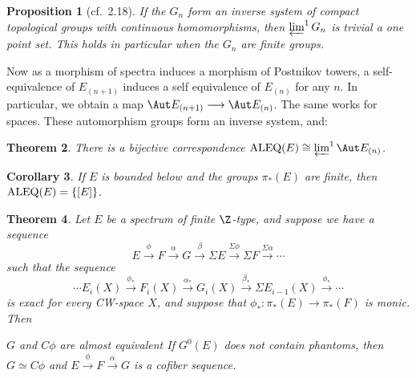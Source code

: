 \documentclass[11pt]{article}
\theoremstyle{plain}
\newtheorem{thm}{Theorem}[subsection]
\newtheorem{prop}[thm]{Proposition}
\newtheorem{cor}[thm]{Corollary}
\theoremstyle{definition}
\newcommand{\ALEQ}{\textup{ALEQ}}
\begin{document}
{\begin{prop}[cf.\ 2.18]
If the $G_n$ form an inverse system of compact topological groups with
continuous homomorphisms, then $\varprojlim^1G_n$ is trivial \lparen a one point
set\rparen. This holds in particular when the $G_n$ are finite groups.
\end{prop}
Now as a morphism of spectra induces a morphism of Postnikov towers, a
self-equivalence of $E_{(n+1)}$ induces a self equivalence of $E_{(n)}$ for any
$n$. In particular, we obtain a map $\Aut E_{(n+1)}\to \Aut E_{(n)}$. The same
works for spaces. These automorphism groups form an inverse system, and:
\begin{thm}
There is a bijective correspondence $\ALEQ(E)\cong\varprojlim^1\Aut E_{(n)}$.
\end{thm}
\begin{cor}
If $E$ is bounded below and the groups $\pi_*(E)$ are finite, then
$\ALEQ(E)=\{[E]\}$.
\end{cor}
\begin{thm}
Let $E$ be a spectrum of finite $\Z$-type, and suppose we have a sequence\upcol
\[E\xrightarrow{\,\phi\,}F\xrightarrow{\,\alpha\,}G\xrightarrow{\,\beta\,}\Sigma 
E\xrightarrow{\Sigma\phi}\Sigma F\xrightarrow{\Sigma\alpha}\cdots\]
such that the sequence
\[\cdots E_i(X)\xrightarrow{\,\phi_*\,}F_i(X)\xrightarrow{\,
\alpha_*\,}G_i(X)\xrightarrow{\,\beta_*\,}\Sigma E_{i-1}(X)\xrightarrow{\,
\phi_*\,}\cdots\]
is exact for every CW-space $X$, and suppose that $\phi_*:\pi_*(E)\to\pi_*(F)$
is monic. Then\upcol
\begin{itemise}
\itm[(i)]$G$ and $C\phi$ are almost equivalent\upsemi
\itm[(ii)]If $G^0(E)$ does not contain phantoms, then $G\simeq C\phi$ and
$E\xrightarrow{\,\phi\,}F\xrightarrow{\,\alpha\,}G$ is a cofiber sequence.
\end{itemise}
\end{thm}
}   %
\end{document}
